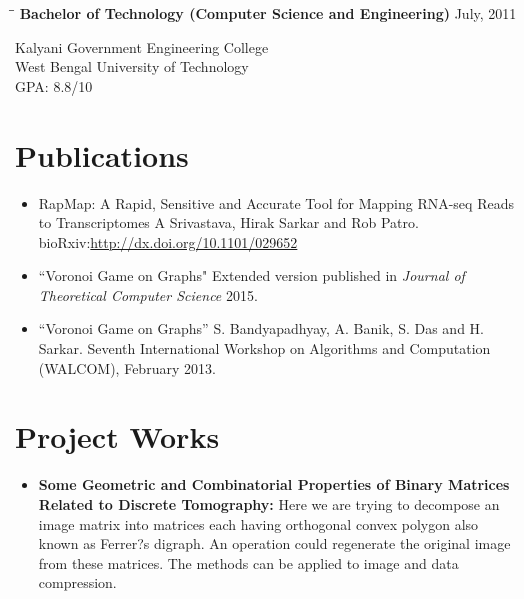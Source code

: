 \documentclass{res}
\begin{document}
\begin{resume}
\vspace{-0.1in}	
\begin{tabbing}
\hspace{2.3in}\= \hspace{2.6in}\= \kill %
{\bf Bachelor of Technology (Computer Science and Engineering)}  \>     \>July, 2011
\end{tabbing}  \vspace{-20pt}      %
Kalyani Government Engineering College \\
West Bengal University of Technology     \\       
GPA: 8.8/10      \\   



\section{Publications}
\begin{itemize}
\item{\color{blue}RapMap: A Rapid, Sensitive and Accurate Tool for Mapping RNA-seq Reads to Transcriptomes} A Srivastava, Hirak Sarkar and Rob Patro.  bioRxiv:\url{http://dx.doi.org/10.1101/029652}
\item {\color{blue}``Voronoi Game on Graphs"} Extended version published in {\it Journal of Theoretical Computer Science} 2015.
\item {\color{blue}``Voronoi Game on Graphs''} S. Bandyapadhyay, A. Banik, S. Das and H. Sarkar. Seventh International Workshop on Algorithms and Computation (WALCOM), February 2013.
\end{itemize}


\section{Project Works}
\begin{itemize}
 
 
 \item {\bf Some Geometric and Combinatorial Properties of Binary Matrices Related to
Discrete Tomography:}
 Here we are trying to decompose an image matrix into matrices
each having orthogonal convex polygon also known as Ferrer?s digraph. An operation could
regenerate the original image from these matrices. The methods can be applied to image and
data compression.  


\end{itemize}
\end{resume}
\end{document}
